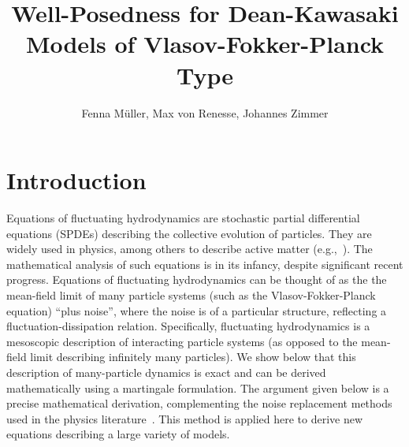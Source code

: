 \documentclass{article}
\begin{document}
\title{Well-Posedness for Dean-Kawasaki Models of Vlasov-Fokker-Planck Type}
\author{Fenna M\"uller, Max von Renesse, Johannes Zimmer}

\maketitle



\section{Introduction}

Equations of fluctuating hydrodynamics are stochastic partial differential equations (SPDEs) describing the
collective evolution of particles. They are widely used in physics, among others to describe active matter
(e.g.,~\cite{Fodor2022a}). The mathematical analysis of such equations is in its infancy, despite significant
recent progress. Equations of fluctuating hydrodynamics can be thought of as the the mean-field limit of many
particle systems (such as the Vlasov-Fokker-Planck equation) ``plus noise'', where the noise is of a
particular structure, reflecting a fluctuation-dissipation relation. Specifically, fluctuating hydrodynamics
is a mesoscopic description of interacting particle systems (as opposed to the mean-field limit describing
infinitely many particles). We show below that this description of many-particle dynamics is exact and can be
derived mathematically using a martingale formulation. The argument given below is a precise mathematical
derivation, complementing the noise replacement methods used in the physics literature~\cite{Dean1996a}. This
method is applied here to derive new equations describing a large variety of models.
\end{document}
